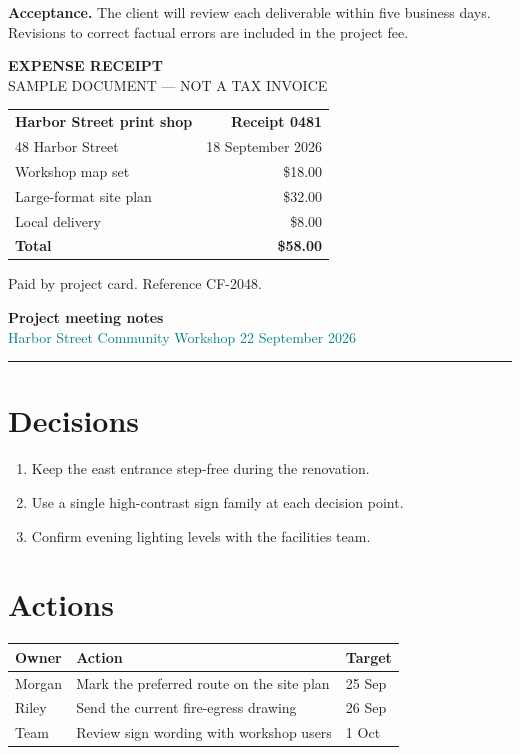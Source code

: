 \documentclass[a4paper,10pt]{article}
\begin{document}
\vspace{18pt}
\colorbox{pale}{%
  \parbox{0.94\textwidth}{%
    \textbf{\textcolor{ink}{Acceptance.}}
    The client will review each deliverable within five business days.
    Revisions to correct factual errors are included in the project fee.}}

\newpage
\begin{center}
  {\Large\bfseries\color{ink} EXPENSE RECEIPT}\\[5pt]
  {\small SAMPLE DOCUMENT --- NOT A TAX INVOICE}
\end{center}
\vspace{14pt}

\begin{tabularx}{\textwidth}{@{}Xr@{}}
\toprule
\textbf{Harbor Street print shop} & \textbf{Receipt 0481}\\
48 Harbor Street & 18 September 2026\\
\midrule
Workshop map set & \$18.00\\
Large-format site plan & \$32.00\\
Local delivery & \$8.00\\
\midrule
\textbf{Total} & \textbf{\$58.00}\\
\bottomrule
\end{tabularx}

\vspace{18pt}
Paid by project card. Reference CF-2048.

\newpage
{\Large\bfseries\color{ink} Project meeting notes}\\
\textcolor{teal}{Harbor Street Community Workshop \hfill 22 September 2026}
\vspace{8pt}
\hrule

\section*{Decisions}
\begin{enumerate}
  \item Keep the east entrance step-free during the renovation.
  \item Use a single high-contrast sign family at each decision point.
  \item Confirm evening lighting levels with the facilities team.
\end{enumerate}

\section*{Actions}
\begin{tabularx}{\textwidth}{@{}p{18mm}X p{27mm}@{}}
\toprule
\textbf{Owner} & \textbf{Action} & \textbf{Target}\\
\midrule
Morgan & Mark the preferred route on the site plan & 25 Sep\\
Riley & Send the current fire-egress drawing & 26 Sep\\
Team & Review sign wording with workshop users & 1 Oct\\
\bottomrule
\end{tabularx}
\end{document}
